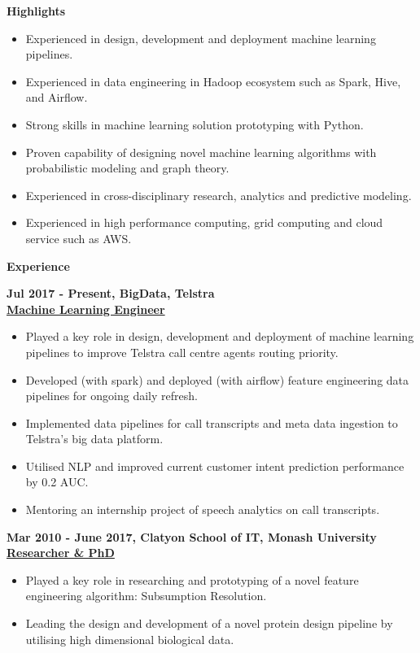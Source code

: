 \documentclass[a4paper,8pt,final]{memoir}
\newcommand{\Sep}{\vspace{1.5em}}
\newcommand{\SmallSep}{\vspace{0.5em}}
\newcommand{\CVSection}[1]
	{\Large\textbf{#1}\par
	\SmallSep\normalsize\normalfont}
\newcommand{\CVItem}[1]
	{\textbf{\color{RoyalBlue} #1}}
\begin{document}

\CVSection{Highlights}
    \begin{itemize}
        \item Experienced in design, development and deployment machine learning pipelines.
        \item Experienced in data engineering in Hadoop ecosystem such as Spark, Hive, and Airflow. 
        \item Strong skills in machine learning solution prototyping with Python.
        \item Proven capability of designing novel machine learning algorithms with probabilistic modeling and graph theory.
        \item Experienced in cross-disciplinary research, analytics and predictive modeling.
        \item Experienced in high performance computing, grid computing and cloud service such as AWS.
    \end{itemize}
\Sep

\CVSection{Experience}

\CVItem{Jul 2017 - Present, BigData, Telstra}\\
\underline{\textbf{Machine Learning Engineer}}\\

    \begin{itemize}
        \item Played a key role in design, development and deployment of machine learning pipelines to improve Telstra call centre agents routing priority.
        \item Developed (with spark) and deployed (with airflow) feature engineering data pipelines for ongoing daily refresh.
        \item Implemented data pipelines for call transcripts and meta data ingestion to Telstra's big data platform.
        \item Utilised NLP and improved current customer intent prediction performance by 0.2 AUC.
        \item Mentoring an internship project of speech analytics on call transcripts.
    \end{itemize}
\Sep

\CVItem{Mar 2010 - June 2017, Clatyon School of IT, Monash University}\\
\underline{\textbf{Researcher \& PhD}}\\

    \begin{itemize}
        \item Played a key role in researching and prototyping of a novel feature engineering algorithm: Subsumption Resolution.
        \item Leading the design and development of a novel protein design pipeline by utilising high dimensional biological data.
    \end{itemize}
\Sep
\end{document}
